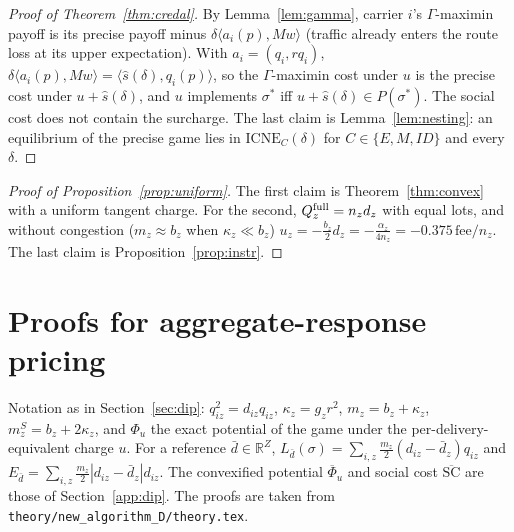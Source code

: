 \documentclass[preprint,11pt]{elsarticle}
\theoremstyle{definition}
\theoremstyle{remark}
\newcommand{\R}{\mathbb{R}}
\newcommand{\ICNE}{\mathrm{ICNE}}
\newcommand{\ip}[2]{\langle #1,#2\rangle}
\begin{document}
\begin{proof}[Proof of Theorem~\ref{thm:credal}]
By Lemma~\ref{lem:gamma}, carrier $i$'s $\Gamma$-maximin payoff is its precise payoff minus $\delta\ip{a_i(p)}{Mw}$ (traffic already enters the route loss at its upper expectation). With $a_i=(q_i,rq_i)$, $\delta\ip{a_i(p)}{Mw}=\ip{\hat s(\delta)}{q_i(p)}$, so the $\Gamma$-maximin cost under $u$ is the precise cost under $u+\hat s(\delta)$, and $u$ implements $\sigma^*$ iff $u+\hat s(\delta)\in P(\sigma^*)$. The social cost does not contain the surcharge. The last claim is Lemma~\ref{lem:nesting}: an equilibrium of the precise game lies in $\ICNE_C(\delta)$ for $C\in\{E,M,ID\}$ and every $\delta$.
\end{proof}

\begin{proof}[Proof of Proposition~\ref{prop:uniform}]
The first claim is Theorem~\ref{thm:convex} with a uniform tangent charge. For the second, $Q^{\rm full}_z=n_zd_z$ with equal lots, and without congestion ($m_z\approx b_z$ when $\kappa_z\ll b_z$) $u_z=-\tfrac{b_z}{2}d_z=-\tfrac{\alpha_z}{4n_z}=-0.375\,\mathrm{fee}/n_z$. The last claim is Proposition~\ref{prop:instr}.
\end{proof}

\section{Proofs for aggregate-response pricing}\label{app:arp}

Notation as in Section~\ref{sec:dip}: $q_{iz}^2=d_{iz}q_{iz}$, $\kappa_z=g_zr^2$, $m_z=b_z+\kappa_z$, $m^S_z=b_z+2\kappa_z$, and $\Phi_u$ the exact potential of the game under the per-delivery-equivalent charge $u$. For a reference $\bar d\in\R^Z$, $L_{\bar d}(\sigma)=\sum_{i,z}\tfrac{m_z}{2}(d_{iz}-\bar d_z)q_{iz}$ and $E_{\bar d}=\sum_{i,z}\tfrac{m_z}{2}|d_{iz}-\bar d_z|d_{iz}$. The convexified potential $\overline\Phi_u$ and social cost $\overline{\mathrm{SC}}$ are those of Section~\ref{app:dip}. The proofs are taken from \texttt{theory/new\_algorithm\_D/theory.tex}.
\end{document}
